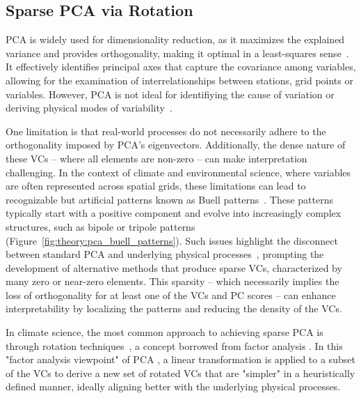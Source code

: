 \subsection{Sparse PCA via Rotation}\label{sec:theory:rotated_pca}
PCA is widely used for dimensionality reduction, as it maximizes the explained variance and provides orthogonality, making it optimal in a least-squares sense~\cite[][]{bishop_pattern_2006}. It effectively identifies principal axes that capture the covariance among variables, allowing for the examination of interrelationships between stations, grid points or variables. However, PCA is not ideal for identifiying the cause of variation or deriving physical modes of variability~\cite{richman_rotation_1986,legates_effect_1993,jolliffe_principal_2002}. 

One limitation is that real-world processes do not necessarily adhere to the orthogonality imposed by PCA's eigenvectors. Additionally, the dense nature of these VCs -- where all elements are non-zero -- can make interpretation challenging. In the context of climate and environmental science, where variables are often represented across spatial grids, these limitations can lead to recognizable but artificial patterns known as Buell patterns~\cite{buell_physical_1979,richman_rotation_1986,legates_effect_1991}. These patterns typically start with a positive component and evolve into increasingly complex structures, such as bipole or tripole patterns (Figure~\ref{fig:theory:pca_buell_patterns}). Such issues highlight the disconnect between standard PCA and underlying physical processes~\cite{richman_rotation_1986}, prompting the development of alternative methods that produce sparse VCs, characterized by many zero or near-zero elements. This sparsity -- which necessarily implies the loss of orthogonality for at least one of the VCs and PC scores -- can enhance interpretability by localizing the patterns and reducing the density of the VCs.

In climate science, the most common approach to achieving sparse PCA is through rotation techniques~\cite{horel_rotated_1981,richman_obliquely_1981,richman_rotation_1986}, a concept borrowed from factor analysis \cite[cf.][pp. 269]{jolliffe_principal_2002}. In this "factor analysis viewpoint" of PCA \cite[][pp. 150-161]{jolliffe_principal_2002}, a linear transformation is applied to a subset of the VCs to derive a new set of rotated VCs that are "simpler" in a heuristically defined manner, ideally aligning better with the underlying physical processes. 

